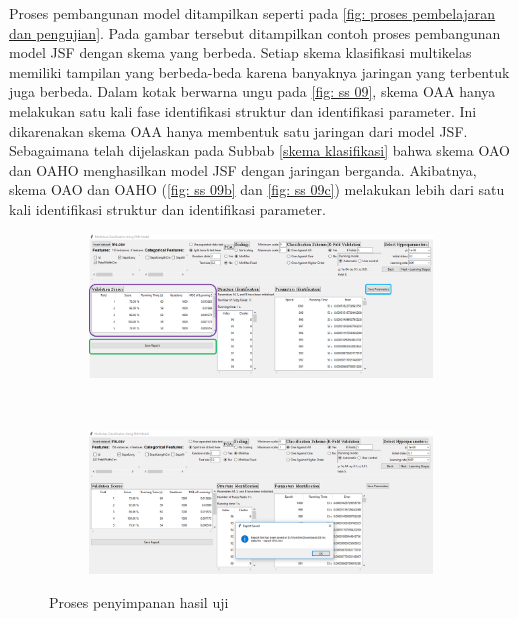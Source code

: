 \noindent Proses pembangunan model ditampilkan seperti pada \ref{fig: proses pembelajaran dan pengujian}. Pada gambar tersebut ditampilkan contoh proses pembangunan model JSF dengan skema yang berbeda. Setiap skema klasifikasi multikelas memiliki tampilan yang berbeda-beda karena banyaknya jaringan yang terbentuk juga berbeda. Dalam kotak berwarna ungu pada \ref{fig: ss 09}, skema OAA hanya melakukan satu kali fase identifikasi struktur dan identifikasi parameter. Ini dikarenakan skema OAA hanya membentuk satu jaringan dari model JSF. Sebagaimana telah dijelaskan pada Subbab \ref{skema klasifikasi} bahwa skema OAO dan OAHO menghasilkan model JSF dengan jaringan berganda. Akibatnya, skema OAO dan OAHO (\ref{fig: ss 09b} dan \ref{fig: ss 09c}) melakukan lebih dari satu kali identifikasi struktur dan identifikasi parameter.

\begin{figure}[h!]
\begin{subfigure}[h]{\textwidth}
  \centering
  \includegraphics[width=.98\linewidth]{SSprogram/10.png}  
  \caption{}
  \label{fig: ss 10}
\end{subfigure}
\\
\begin{subfigure}[h]{\textwidth}
  \centering
  \includegraphics[width=.98\linewidth]{SSprogram/11.png}
  \caption{}
  \label{fig: ss 11}
\end{subfigure}%
\caption{Proses penyimpanan hasil uji}
\label{fig: proses penyimpanan hasil uji}
\end{figure}

